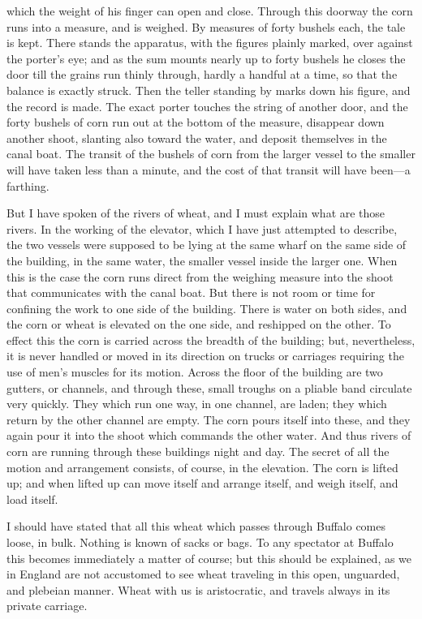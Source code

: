 which the weight of his finger can open and close.  Through this
doorway the corn runs into a measure, and is weighed.  By measures
of forty bushels each, the tale is kept.  There stands the
apparatus, with the figures plainly marked, over against the
porter's eye; and as the sum mounts nearly up to forty bushels he
closes the door till the grains run thinly through, hardly a
handful at a time, so that the balance is exactly struck.  Then the
teller standing by marks down his figure, and the record is made.
The exact porter touches the string of another door, and the forty
bushels of corn run out at the bottom of the measure, disappear
down another shoot, slanting also toward the water, and deposit
themselves in the canal boat.  The transit of the bushels of corn
from the larger vessel to the smaller will have taken less than a
minute, and the cost of that transit will have been---a farthing.

But I have spoken of the rivers of wheat, and I must explain what
are those rivers.  In the working of the elevator, which I have
just attempted to describe, the two vessels were supposed to be
lying at the same wharf on the same side of the building, in the
same water, the smaller vessel inside the larger one.  When this is
the case the corn runs direct from the weighing measure into the
shoot that communicates with the canal boat.  But there is not room
or time for confining the work to one side of the building.  There
is water on both sides, and the corn or wheat is elevated on the
one side, and reshipped on the other.  To effect this the corn is
carried across the breadth of the building; but, nevertheless, it
is never handled or moved in its direction on trucks or carriages
requiring the use of men's muscles for its motion.  Across the
floor of the building are two gutters, or channels, and through
these, small troughs on a pliable band circulate very quickly.
They which run one way, in one channel, are laden; they which
return by the other channel are empty.  The corn pours itself into
these, and they again pour it into the shoot which commands the
other water.  And thus rivers of corn are running through these
buildings night and day.  The secret of all the motion and
arrangement consists, of course, in the elevation.  The corn is
lifted up; and when lifted up can move itself and arrange itself,
and weigh itself, and load itself.

I should have stated that all this wheat which passes through
Buffalo comes loose, in bulk.  Nothing is known of sacks or bags.
To any spectator at Buffalo this becomes immediately a matter of
course; but this should be explained, as we in England are not
accustomed to see wheat traveling in this open, unguarded, and
plebeian manner.  Wheat with us is aristocratic, and travels always
in its private carriage.

